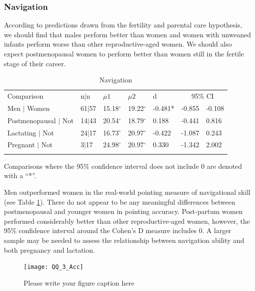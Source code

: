 		\subsubsection{Navigation}
		\label{sec:3.1.2}

According to predictions drawn from the fertility and parental care hypothesis, we should find that males perform better than women and women with unweaned infants perform worse than other reproductive-aged women.  We should also expect postmenopausal women to perform better than women still in the fertile stage of their career.

\begin{table}[h!]
\caption{Navigation}
\label{tab:nav}  
\begin{tabular}{lllllll}
\hline\noalign{\smallskip}
Comparison & \phantom{0}n$|$n & $\mu1$ & $\mu2$ & d & \multicolumn{2}{c}{95\% CI} \\
\noalign{\smallskip}\hline\noalign{\smallskip}
Men $|$ Women & 61$|$57 & 15.18$^{\circ}$ & 19.22$^{\circ}$ & -0.481* & -0.855 & -0.108 \\
Postmenopausal $|$ Not & 14$|$43 & 20.54$^{\circ}$ & 18.79$^{\circ}$  & \phantom{-}0.188 & -0.441 & \phantom{-}0.816\\
Lactating $|$ Not & 24$|$17 & 16.73$^{\circ}$ & 20.97$^{\circ}$  & -0.422 & -1.087 & \phantom{-}0.243 \\
Pregnant $|$ Not & 3$|$17 & 24.98$^{\circ}$ & 20.97$^{\circ}$  & \phantom{-}0.330 & -1.342 & \phantom{-}2.002 \\
\noalign{\smallskip}\hline
\end{tabular}\par
\bigskip
Comparisons where the 95\% confidence interval does not include 0 are denoted with a ``*''.
\end{table}		  


Men outperformed women in the real-world pointing measure of navigational skill (see Table \ref{tab:nav}).  There do not appear to be any meaningful differences between postmenopausal and younger women in pointing accuracy.  Post-partum women performed considerably better than other reproductive-aged women, however, the 95\% confidence interval around the Cohen's D measure includes 0.  A larger sample may be needed to assess the relationship between navigation ability and both pregnancy and lactation.

\begin{figure}[!htb]
  \texttt{[image: QQ\_3\_Acc]}
\caption{Please write your figure caption here}
\label{fig:1}       %
\end{figure}

